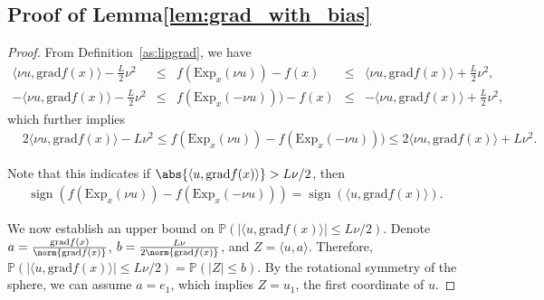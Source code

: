 \documentclass{article}
\newcommand{\rgrad}{\mathrm{grad}}
\newcommand{\pert}{\nu}
\DeclareMathOperator{\sign}{sign}
\theoremstyle{plain}
\theoremstyle{definition}
\theoremstyle{remark}
\begin{document}
\subsection{Proof of Lemma\ref{lem:grad_with_bias}}\label{pf:grad_with_bias}
\begin{proof}
From Definition~\ref{as:lipgrad}, we have
\[
\begin{array}{rlcll}
\langle\pert u , \rgrad f(x)\rangle - \frac{L}{2}\pert^2 & \leq & f(\mathrm{Exp}_x(\pert u)) - f(x) & \leq & \langle\pert u , \rgrad f(x)\rangle + \frac{L}{2}\pert^2, \\ 
-\langle\pert u , \rgrad f(x)\rangle - \frac{L}{2}\pert^2 & \leq & f(\mathrm{Exp}_x(-\pert u))) - f(x) & \leq & -\langle\pert u , \rgrad f(x)\rangle + \frac{L}{2}\pert^2, 
\end{array}
\]
which further implies 
\begin{align*}
&2\langle\pert u , \rgrad f(x)\rangle - L\pert^2 \leq f(\mathrm{Exp}_x(\pert u))-f(\mathrm{Exp}_x(-\pert u))) \leq 2\langle\pert u , \rgrad f(x)\rangle +L\pert^2.%
\end{align*}

Note that this indicates if $\abs{\langle u , \rgrad f(x)\rangle} >L\pert/2$, then
\begin{align}\label{lem:grad_with_bias-proof-sign-eq}
\sign (f(\mathrm{Exp}_x(\pert u)) - f(\mathrm{Exp}_x(-\pert u)))= \sign (\langle u , \rgrad f(x)\rangle).
\end{align}


We now establish an upper bound on $\mathbb{P}(|\langle u , \rgrad f(x)\rangle|\leq{L} \pert/2 )$. Denote $a=\frac{\rgrad f(x)}{\norm{\rgrad f(x)}}$, $b=\frac{{L}\pert}{2\norm{\rgrad f(x)}}$, and $Z = \langle u , a\rangle$. Therefore, $\mathbb{P}(|\langle u , \rgrad f(x)\rangle|\leq{L} \pert/2 ) = \mathbb{P}(|Z| \leq b)$. By the rotational symmetry of the sphere, we can assume ${a} = e_1$, which implies $Z = u_1$, the first coordinate of $u$. 


\end{proof}
\end{document}
